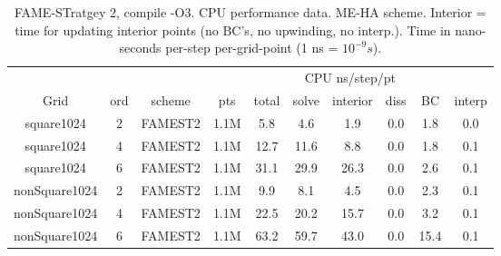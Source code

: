 {
\begin{table}[hbt] \small
\centering
\begin{tabular}{|c|c|c|c|c|c|c|c|c|c|} \hline
            &        &       & \multicolumn{7}{c|}{CPU ns/step/pt}  \\ 
   Grid         & ord & scheme & pts   & total   &  solve  &  interior  & diss  &   BC  & interp \\  \hline
  square1024 & 2 & FAMEST2  & 1.1M  &     5.8 &     4.6 &     1.9 &     0.0 &     1.8 &     0.0   \\
  square1024 & 4 & FAMEST2  & 1.1M  &    12.7 &    11.6 &     8.8 &     0.0 &     1.8 &     0.1   \\
  square1024 & 6 & FAMEST2  & 1.1M  &    31.1 &    29.9 &    26.3 &     0.0 &     2.6 &     0.1   \\
\hline
  nonSquare1024 & 2 & FAMEST2  & 1.1M  &     9.9 &     8.1 &     4.5 &     0.0 &     2.3 &     0.1   \\
  nonSquare1024 & 4 & FAMEST2  & 1.1M  &    22.5 &    20.2 &    15.7 &     0.0 &     3.2 &     0.1   \\
  nonSquare1024 & 6 & FAMEST2  & 1.1M  &    63.2 &    59.7 &    43.0 &     0.0 &    15.4 &     0.1   \\   
\hline  
\end{tabular}
\caption{FAME-STratgey 2, compile -O3. CPU performance data. ME-HA scheme. Interior = time for updating interior points (no BC's, no upwinding, no interp.).
Time in nano-seconds per-step per-grid-point (1 ns = $10^{-9}s$).
}
\label{tab:cpuPerformance}    
\end{table}
}




